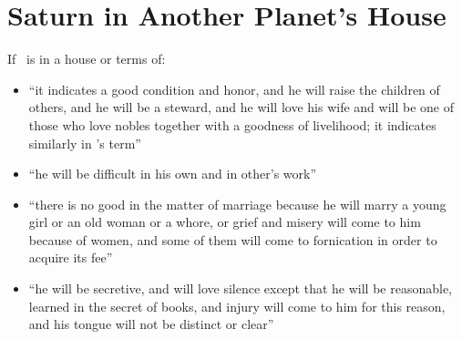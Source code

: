\section{Saturn in Another Planet's House}
If \Saturn\, is in a house or terms of:
\begin{itemize}[topsep=0em,itemsep=0em]
\item[\Jupiter] ``it indicates a good condition and honor, and he will raise the children of others, and he will be a steward, and he will love his wife and will be one of those who love nobles together with a goodness of livelihood; it indicates similarly in \Jupiter's term''

\item[\Mars] ``he will be difficult in his own and in other's work''

\item[\Venus] ``there is no good in the matter of marriage because he will marry a young girl or an old woman or a whore, or grief and misery will come to him because of women, and some of them will come to fornication in order to acquire its fee''

\item[\Mercury] ``he will be secretive, and will love silence except that he will be reasonable, learned in the secret of books, and injury will come to him for this reason, and his tongue will not be distinct or clear''


\end{itemize}